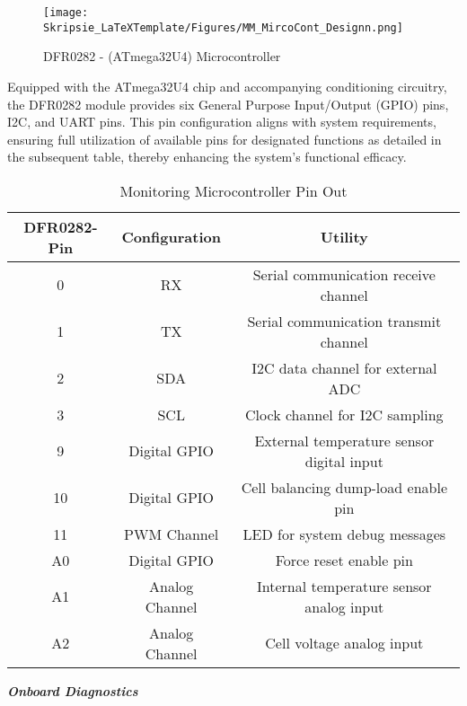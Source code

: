 \begin{figure}[h!]
\centering
\texttt{[image: Skripsie\_LaTeXTemplate/Figures/MM\_MircoCont\_Designn.png]}
\caption{DFR0282 - (ATmega32U4) Microcontroller \cite{beetle}}
\label{fig:MM_D6}
\end{figure}

\noindent
Equipped with the ATmega32U4 chip and accompanying conditioning circuitry, the DFR0282 module provides six General Purpose Input/Output (GPIO) pins, I2C, and UART pins. This pin configuration aligns with system requirements, ensuring full utilization of available pins for designated functions as detailed in the subsequent table, thereby enhancing the system's functional efficacy.

\begin{table}[h]
    \centering
    \caption{Monitoring Microcontroller Pin Out}
    \label{tab:Beetle_PinOut}
    \begin{tabular}{|c|c|c|}
        \hline
        \textbf{DFR0282-Pin} & \textbf{Configuration} & \textbf{Utility} \\
        \hline
        \hline
        0 & RX & Serial communication receive channel \\
        \hline
        1 & TX & Serial communication transmit channel \\
        \hline
        2 & SDA & I2C data channel for external ADC \\
        \hline
        3 & SCL & Clock channel for I2C sampling \\
        \hline
        9 & Digital GPIO & External temperature sensor digital input \\
        \hline
        10 & Digital GPIO & Cell balancing dump-load enable pin \\
        \hline
        11 & PWM Channel & LED for system debug messages \\
        \hline
        A0 & Digital GPIO & Force reset enable pin \\
        \hline
        A1 & Analog Channel & Internal temperature sensor analog input \\
        \hline
        A2 & Analog Channel & Cell voltage analog input \\
        \hline
    \end{tabular}
\end{table}

\noindent
\textbf{\emph{Onboard Diagnostics}}\label{subsubsec:IntTemp_and_DB_LED}

